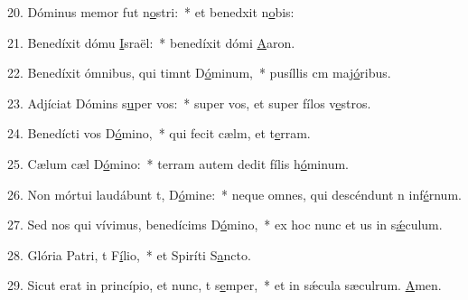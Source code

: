 20. Dóminus memor fut n\uline{o}stri:~* et benedxit n\uline{o}bis:\par 
21. Benedíxit dómu \uline{I}sraël:~* benedíxit dómi \uline{A}aron.\par 
22. Benedíxit ómnibus, qui timnt D\uline{ó}minum,~* pusíllis cm maj\uline{ó}ribus.\par 
23. Adjíciat Dómins s\uline{u}per vos:~* super vos, et super fílos v\uline{e}stros.\par 
24. Benedícti vos  D\uline{ó}mino,~* qui fecit cælm, et t\uline{e}rram.\par 
25. Cælum cæl D\uline{ó}mino:~* terram autem dedit fílis h\uline{ó}minum.\par 
26. Non mórtui laudábunt t, D\uline{ó}mine:~* neque omnes, qui descéndunt n inf\uline{é}rnum.\par 
27. Sed nos qui vívimus, benedícims D\uline{ó}mino,~* ex hoc nunc et us in s\uline{ǽ}culum.\par 
28. Glória Patri, t F\uline{í}lio,~* et Spiríti S\uline{a}ncto.\par 
29. Sicut erat in princípio, et nunc, t s\uline{e}mper,~* et in sǽcula sæculrum. \uline{A}men.\par 
